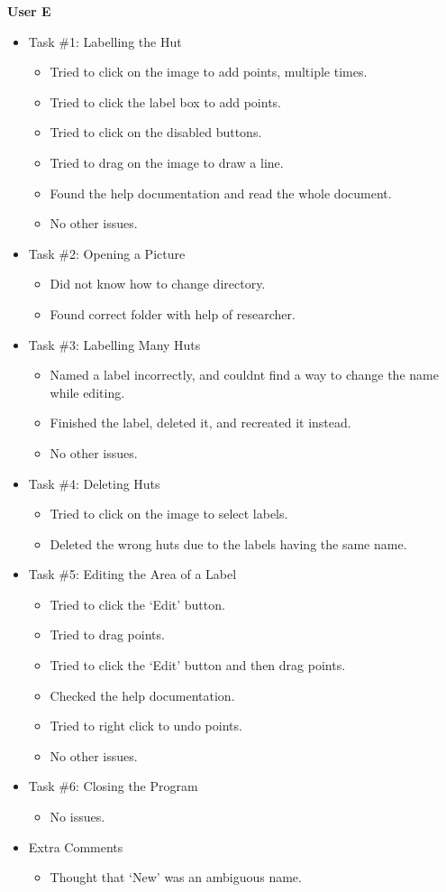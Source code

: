\documentclass[11pt,twocolumn]{article}
\begin{document}
\textbf{User E}
\begin{itemize}
\item Task \#1: Labelling the Hut
\begin{itemize}
\item Tried to click on the image to add points, multiple times.
\item Tried to click the label box to add points.
\item Tried to click on the disabled buttons.
\item Tried to drag on the image to draw a line.
\item Found the help documentation and read the whole document.
\item No other issues.
\end{itemize}
\item Task \#2: Opening a Picture
\begin{itemize}
\item Did not know how to change directory.
\item Found correct folder with help of researcher.
\end{itemize}
\item Task \#3: Labelling Many Huts
\begin{itemize}
\item Named a label incorrectly, and couldnt find a way to change the name while editing.
\item Finished the label, deleted it, and recreated it instead.
\item No other issues.
\end{itemize}
\item Task \#4: Deleting Huts
\begin{itemize}
\item Tried to click on the image to select labels.
\item Deleted the wrong huts due to the labels having the same name.
\end{itemize}
\item Task \#5: Editing the Area of a Label
\begin{itemize}
\item Tried to click the `Edit' button.
\item Tried to drag points.
\item Tried to click the `Edit' button and then drag points.
\item Checked the help documentation.
\item Tried to right click to undo points.
\item No other issues.
\end{itemize}
\item Task \#6: Closing the Program
\begin{itemize}
\item No issues.
\end{itemize}
\item Extra Comments
\begin{itemize}
\item Thought that `New' was an ambiguous name.
\end{itemize}
\end{itemize}
\end{document}

